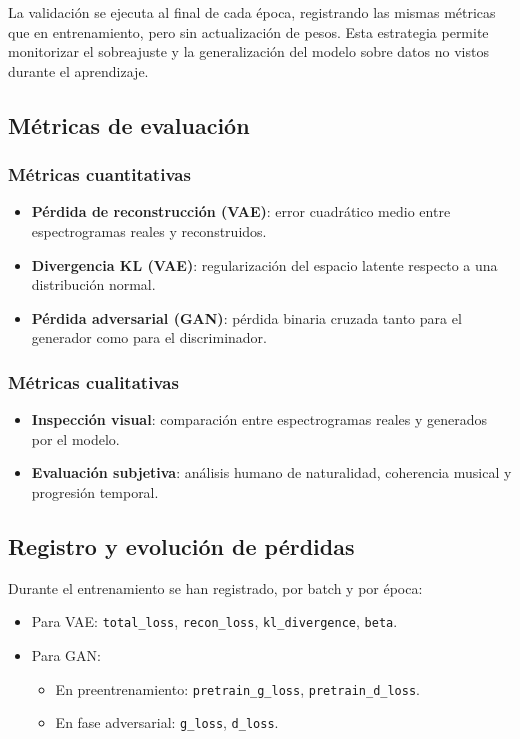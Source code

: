 La validación se ejecuta al final de cada época, registrando las mismas métricas que en entrenamiento, pero sin actualización de pesos. Esta estrategia permite monitorizar el sobreajuste y la generalización del modelo sobre datos no vistos durante el aprendizaje.

\subsection{Métricas de evaluación}

\subsubsection*{Métricas cuantitativas}

\begin{itemize}
    \item \textbf{Pérdida de reconstrucción (VAE)}: error cuadrático medio entre espectrogramas reales y reconstruidos.
    \item \textbf{Divergencia KL (VAE)}: regularización del espacio latente respecto a una distribución normal.
    \item \textbf{Pérdida adversarial (GAN)}: pérdida binaria cruzada tanto para el generador como para el discriminador.
\end{itemize}

\subsubsection*{Métricas cualitativas}

\begin{itemize}
    \item \textbf{Inspección visual}: comparación entre espectrogramas reales y generados por el modelo.
    \item \textbf{Evaluación subjetiva}: análisis humano de naturalidad, coherencia musical y progresión temporal.
\end{itemize}

\subsection{Registro y evolución de pérdidas}

Durante el entrenamiento se han registrado, por batch y por época:

\begin{itemize}
    \item Para VAE: \texttt{total\_loss}, \texttt{recon\_loss}, \texttt{kl\_divergence}, \texttt{beta}.
    \item Para GAN:
        \begin{itemize}
            \item En preentrenamiento: \texttt{pretrain\_g\_loss}, \texttt{pretrain\_d\_loss}.
            \item En fase adversarial: \texttt{g\_loss}, \texttt{d\_loss}.
        \end{itemize}
\end{itemize}

